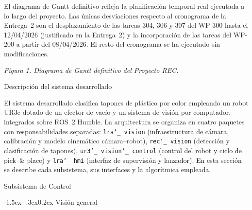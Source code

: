 \documentclass[12pt,a4paper]{article}
\makeatletter
\newcommand{\secfmt}[1]{%
  \noindent\colorbox{BlueHeader}{%
    \parbox[b]{\dimexpr\linewidth-2\fboxsep}{%
      \vspace{5pt}%
      \textcolor{white}{\large\bfseries #1}%
      \vspace{5pt}%
    }%
  }\par\vspace{4pt}%
}
\renewcommand\section{%
  \@ifstar\section@star\section@nostar
}
\newcommand\section@nostar[1]{%
  \refstepcounter{section}%
  \addcontentsline{toc}{section}{\protect\numberline{\thesection}#1}%
  \secfmt{\thesection.\enspace #1}%
}
\newcommand\section@star[1]{%
  \secfmt{#1}%
}
\newcommand{\subsecfmt}[1]{%
  {\large\bfseries\color{MediumBlue}#1}%
  \par\vspace{2pt}%
}
\renewcommand\subsection{%
  \@ifstar\subsection@star\subsection@nostar
}
\newcommand\subsection@nostar[1]{%
  \refstepcounter{subsection}%
  \addcontentsline{toc}{subsection}{\protect\numberline{\thesubsection}#1}%
  \vspace{10pt}%
  \subsecfmt{\thesubsection.\enspace #1}%
  \vspace{2pt}%
}
\newcommand\subsection@star[1]{%
  \vspace{10pt}\subsecfmt{#1}\vspace{2pt}%
}
\renewcommand\subsubsection{\@startsection{subsubsection}{3}{\z@}%
  {-1.5ex \@plus -.3ex}{0.2ex}%
  {\normalsize\bfseries\color{MediumBlue}}}
\newcommand{\code}[1]{%
  \begingroup
  \def\_{\char`_\penalty0 }%
  \def\/{\char`/\penalty0 }%
  \texttt{\small #1}%
  \endgroup}
\makeatother
\begin{document}
El diagrama de Gantt definitivo refleja la planificación temporal real ejecutada a lo largo del proyecto.
Las únicas desviaciones respecto al cronograma de la Entrega~2 son el desplazamiento de las tareas 304,
306 y 307 del WP-300 hasta el 12/04/2026 (justificado en la Entrega~2) y la incorporación de las tareas
del WP-200 a partir del 08/04/2026. El resto del cronograma se ha ejecutado sin modificaciones.

\vspace{8pt}
\begin{center}
  \setlength{\fboxrule}{0.6pt}
\end{center}
\begin{center}
  {\small\color{DarkGray}\textit{Figura 1. Diagrama de Gantt definitivo del Proyecto REC.}}
\end{center}


\clearpage
\section{Descripción del sistema desarrollado}

El sistema desarrollado clasifica tapones de plástico por color empleando un robot UR3e dotado de un
efector de vacío y un sistema de visión por computador, integrados sobre ROS~2 Humble. La arquitectura
se organiza en cuatro paquetes con responsabilidades separadas: \code{lra\_vision} (infraestructura de
cámara, calibración y modelo cinemático cámara--robot), \code{rec\_vision} (detección y clasificación de
tapones), \code{ur3\_vision\_control} (control del robot y ciclo de pick~\& place) y \code{lra\_hmi}
(interfaz de supervisión y lanzador). En esta sección se describe cada subsistema, sus interfaces y la
algorítmica empleada.

\subsection{Subsistema de Control}

\subsubsection{Visión general}
\end{document}
